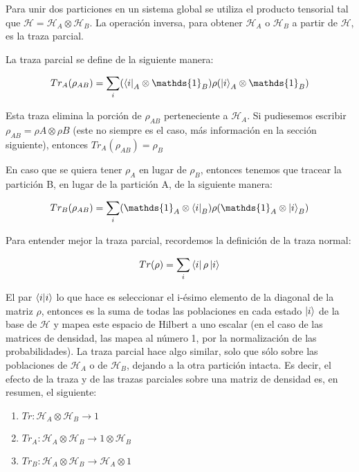 Para unir dos particiones en un sistema global se utiliza el producto tensorial tal que $\mathcal{H} = \mathcal{H}_A \otimes \mathcal{H}_B$. La operación inversa, para obtener $\mathcal{H}_A$ o $\mathcal{H}_B$ a partir de $\mathcal{H}$, es la traza parcial.

La traza parcial se define de la siguiente manera:

\begin{equation}
    Tr_A(\rho_{A B}) = \sum\limits_i (\bra{i}_A \otimes \mathds{1}_B) \rho (\ket{i}_A \otimes \mathds{1}_B)
\end{equation}

Esta traza elimina la porción de $\rho_{A B}$ perteneciente a $\mathcal{H}_A$. Si pudiesemos escribir $\rho_{A B} = \rho{A} \otimes \rho{B}$ (este no siempre es el caso, más información en la sección siguiente), entonces $Tr_A(\rho_{A B}) = \rho_B$

En caso que se quiera tener $\rho_A$ en lugar de $\rho_B$, entonces tenemos que tracear la partición B, en lugar de la partición A, de la siguiente manera:

\begin{equation}
    Tr_B(\rho_{A B}) = \sum\limits_i (\mathds{1}_A \otimes \bra{i}_B) \rho (\mathds{1}_A \otimes \ket{i}_B)
\end{equation}

Para entender mejor la traza parcial, recordemos la definición de la traza normal:

\begin{equation}
    Tr(\rho) = \sum\limits_i \bra{i} \rho \ket{i}
\end{equation}

El par $\bra{i} \ket{i}$ lo que hace es seleccionar el i-ésimo elemento de la diagonal de la matriz $\rho$, entonces es la suma de todas las poblaciones en cada estado $\ket{i}$ de la base de $\mathcal{H}$ y mapea este espacio de Hilbert a uno escalar (en el caso de las matrices de densidad, las mapea al número 1, por la normalización de las probabilidades). La traza parcial hace algo similar, solo que sólo sobre las poblaciones de $\mathcal{H}_A$ o de $\mathcal{H}_B$, dejando a la otra partición intacta. Es decir, el efecto de la traza y de las trazas parciales sobre una matriz de densidad es, en resumen, el siguiente:

\begin{enumerate}
    \item $Tr: \mathcal{H}_A \otimes \mathcal{H}_B \rightarrow 1$
    \item $Tr_A: \mathcal{H}_A \otimes \mathcal{H}_B \rightarrow 1 \otimes \mathcal{H}_B$
    \item $Tr_B: \mathcal{H}_A \otimes \mathcal{H}_B \rightarrow \mathcal{H}_A \otimes 1$
\end{enumerate}


